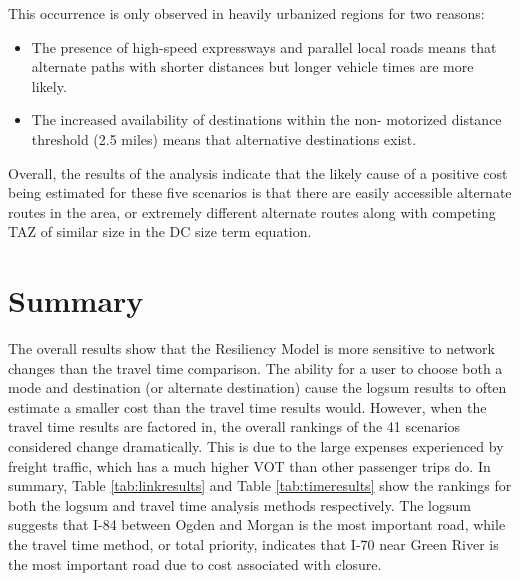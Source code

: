 This occurrence is only observed in heavily urbanized regions for two reasons:
\begin{itemize}
	\item The presence of high-speed expressways and parallel local roads
  means that alternate paths with shorter distances but longer vehicle
  times are more likely.
	\item The increased availability of destinations within the non-
  motorized distance threshold (2.5 miles) means that alternative
  destinations exist.

\end{itemize}

Overall, the results of the analysis indicate that the likely cause of a
positive cost being estimated for these five scenarios is that there are
easily
accessible alternate routes in the area, or extremely different alternate
routes along with competing TAZ of similar size in the DC size term
equation.

\section{Summary}

The overall results show that the Resiliency Model is more sensitive to
network changes than the travel time comparison. The ability for a user to
choose both a mode and destination (or alternate destination) cause the
logsum results to often estimate a smaller cost than the travel time
results would. However, when the travel time results are factored in, the
overall rankings of the 41 scenarios considered change dramatically. This
is due to the large expenses experienced by freight traffic, which has a
much higher VOT than other passenger trips do. In summary, Table
\ref{tab:linkresults} and Table \ref{tab:timeresults} show the rankings
for both the logsum and travel time analysis methods respectively. The
logsum suggests that I-84 between Ogden and Morgan is the most important
road, while the travel time method, or total priority, indicates that I-70
near Green River is the most important road due to cost associated with
closure.

